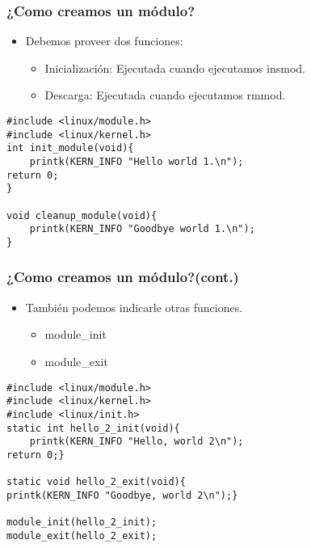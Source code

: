 \begin{frame}[fragile]
\frametitle{¿Como creamos un módulo?}
  \begin{itemize}
  \item Debemos proveer dos funciones:
 	 \begin{itemize}
 	   \item Inicialización: Ejecutada cuando ejecutamos insmod.
 	 \end{itemize} 
	 \begin{itemize}
 	   \item Descarga: Ejecutada cuando ejecutamos rmmod.
 	 \end{itemize} 
  \end{itemize}

\begin{lstlisting}
#include <linux/module.h> 
#include <linux/kernel.h> 
int init_module(void){
	printk(KERN_INFO "Hello world 1.\n");
return 0;
}

void cleanup_module(void){
	printk(KERN_INFO "Goodbye world 1.\n");
}
\end{lstlisting}
\end{frame}


\begin{frame}[fragile]
\frametitle{¿Como creamos un módulo?(cont.)}
  \begin{itemize}
  \item También podemos indicarle otras funciones.
 	 \begin{itemize}
 	   \item module\_init
	   \item module\_exit
 	 \end{itemize} 
  \end{itemize}

\begin{lstlisting}
#include <linux/module.h>
#include <linux/kernel.h>
#include <linux/init.h>
static int hello_2_init(void){
	printk(KERN_INFO "Hello, world 2\n");
return 0;}

static void hello_2_exit(void){
printk(KERN_INFO "Goodbye, world 2\n");}

module_init(hello_2_init);
module_exit(hello_2_exit);
\end{lstlisting}
\end{frame}

